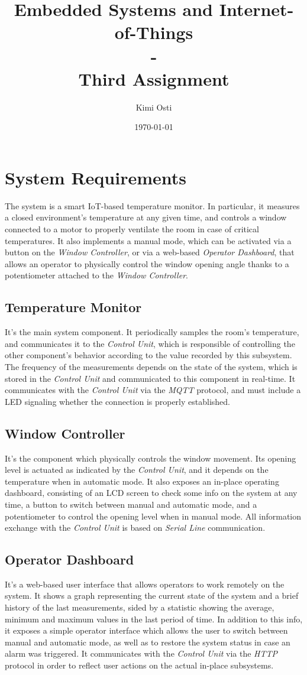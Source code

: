\documentclass[a4paper,12pt]{report}
\title{Embedded Systems and Internet-of-Things \\ - \\ Third Assignment}
\author{Kimi Osti}
\date{\today}
\begin{document}
	
	\maketitle
	\tableofcontents
	
	\chapter{System Requirements}
	The system is a smart IoT-based temperature monitor. In particular, it measures a closed environment's temperature at any given time, and controls a window connected to a motor to properly ventilate the room in case of critical temperatures. It also implements a manual mode, which can be activated via a button on the \textit{Window Controller}, or via a web-based \textit{Operator Dashboard}, that allows an operator to physically control the window opening angle thanks to a potentiometer attached to the \textit{Window Controller}.
	\section{Temperature Monitor}
	It's the main system component. It periodically samples the room's temperature, and communicates it to the \textit{Control Unit}, which is responsible of controlling the other component's behavior according to the value recorded by this subsystem. The frequency of the measurements depends on the state of the system, which is stored in the \textit{Control Unit} and communicated to this component in real-time. It communicates with the \textit{Control Unit} via the \textit{MQTT} protocol, and must include a LED signaling whether the connection is properly established.
	\section{Window Controller}
	It's the component which physically controls the window movement. Its opening level is actuated as indicated by the \textit{Control Unit}, and it depends on the temperature when in automatic mode. It also exposes an in-place operating dashboard, consisting of an LCD screen to check some info on the system at any time, a button to switch between manual and automatic mode, and a potentiometer to control the opening level when in manual mode. All information exchange with the \textit{Control Unit} is based on \textit{Serial Line} communication.
	\section{Operator Dashboard}
	It's a web-based user interface that allows operators to work remotely on the system. It shows a graph representing the current state of the system and a brief history of the last measurements, sided by a statistic showing the average, minimum and maximum values in the last period of time. In addition to this info, it exposes a simple operator interface which allows the user to switch between manual and automatic mode, as well as to restore the system status in case an alarm was triggered. It communicates with the \textit{Control Unit} via the \textit{HTTP} protocol in order to reflect user actions on the actual in-place subsystems.
\end{document}
